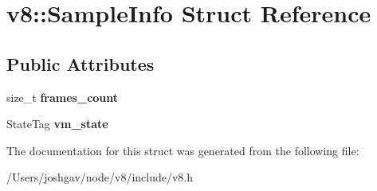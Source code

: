 \hypertarget{structv8_1_1_sample_info}{}\section{v8\+:\+:Sample\+Info Struct Reference}
\label{structv8_1_1_sample_info}
\subsection*{Public Attributes}
\begin{DoxyCompactItemize}
\item 
size\+\_\+t {\bfseries frames\+\_\+count}\hypertarget{structv8_1_1_sample_info_a5f1e51bc358605e0c1d38fb2f3d344cd}{}\label{structv8_1_1_sample_info_a5f1e51bc358605e0c1d38fb2f3d344cd}

\item 
State\+Tag {\bfseries vm\+\_\+state}\hypertarget{structv8_1_1_sample_info_afd6198c9feb44a8df79576cf427b9a91}{}\label{structv8_1_1_sample_info_afd6198c9feb44a8df79576cf427b9a91}

\end{DoxyCompactItemize}


The documentation for this struct was generated from the following file\+:\begin{DoxyCompactItemize}
\item 
/\+Users/joshgav/node/v8/include/v8.\+h\end{DoxyCompactItemize}
